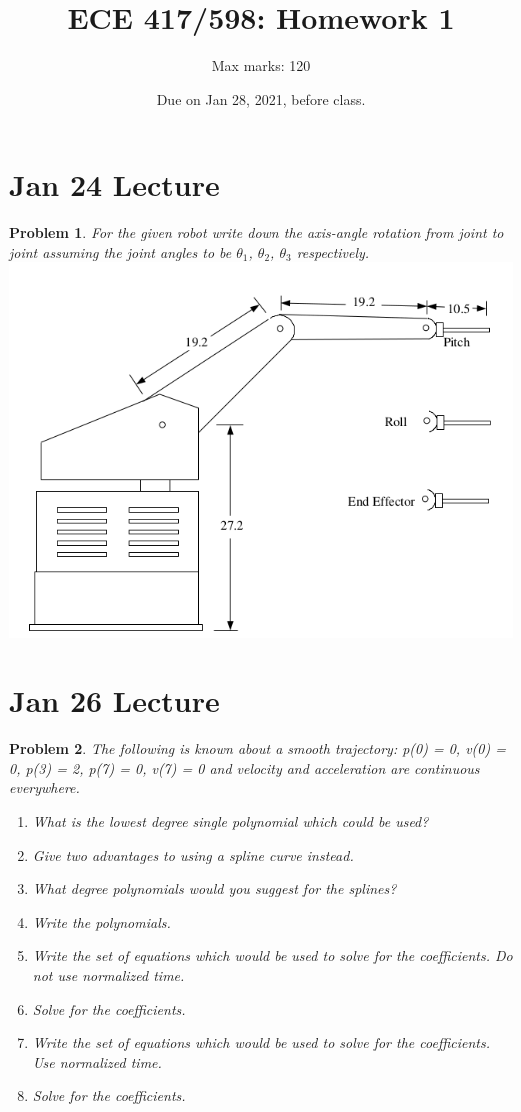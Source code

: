 \documentclass[twocolumn]{article}
\title{ECE 417/598: Homework 1}
\author{Max marks: 120}
\date{Due on Jan 28, 2021, before class.}
\newtheorem{prob}{Problem}
\begin{document}
\maketitle
\section{Jan 24 Lecture}
\begin{prob}
  For the given robot write down the axis-angle rotation from joint to joint
  assuming the joint angles to be  $\theta_1$, $\theta_2$, $\theta_3$ respectively.
  \\
  \includegraphics[width=\linewidth]{robot.png}
  \\
\end{prob}

\section{Jan 26 Lecture}
\begin{prob}
  The following is known about a smooth trajectory: p(0) = 0, v(0) = 0, 
  p(3) = 2, p(7) = 0, v(7) = 0 and velocity and acceleration are 
  continuous everywhere.  

  \begin{enumerate}
  \item What is the lowest degree single polynomial which could be used?  
  \item Give two advantages to using a spline curve instead. 
  \item What degree polynomials would you suggest for the splines?  
  \item Write the polynomials.  
  \item Write the set of equations which would be used to solve for the coefficients. Do not use normalized time. 
  \item Solve for the coefficients.
  \item Write the set of equations which would be used to solve for the coefficients. Use normalized time. 
  \item Solve for the coefficients.
  \end{enumerate}
\end{prob}


%
%
\end{document}
